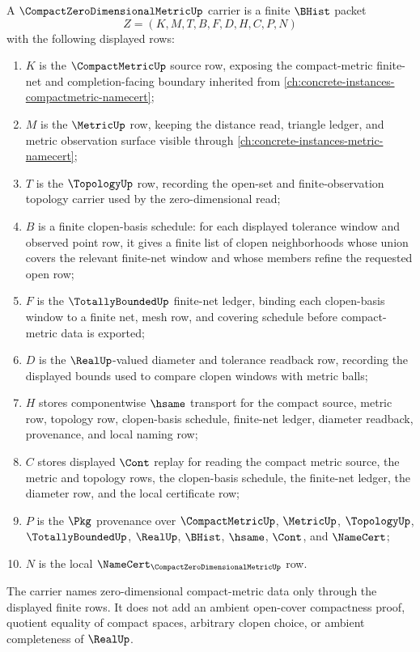 \begin{definition}
\label{def:compact-zero-dimensional-metric-carrier}
A $\CompactZeroDimensionalMetricUp$ carrier is a finite $\BHist$ packet
$$
Z=(K,M,T,B,F,D,H,C,P,N)
$$
with the following displayed rows:
\begin{enumerate}
\item $K$ is the $\CompactMetricUp$ source row, exposing the compact-metric finite-net and completion-facing boundary inherited from \autoref{ch:concrete-instances-compactmetric-namecert};
\item $M$ is the $\MetricUp$ row, keeping the distance read, triangle ledger, and metric observation surface visible through \autoref{ch:concrete-instances-metric-namecert};
\item $T$ is the $\TopologyUp$ row, recording the open-set and finite-observation topology carrier used by the zero-dimensional read;
\item $B$ is a finite clopen-basis schedule: for each displayed tolerance window and observed point row, it gives a finite list of clopen neighborhoods whose union covers the relevant finite-net window and whose members refine the requested open row;
\item $F$ is the $\TotallyBoundedUp$ finite-net ledger, binding each clopen-basis window to a finite net, mesh row, and covering schedule before compact-metric data is exported;
\item $D$ is the $\RealUp$-valued diameter and tolerance readback row, recording the displayed bounds used to compare clopen windows with metric balls;
\item $H$ stores componentwise $\hsame$ transport for the compact source, metric row, topology row, clopen-basis schedule, finite-net ledger, diameter readback, provenance, and local naming row;
\item $C$ stores displayed $\Cont$ replay for reading the compact metric source, the metric and topology rows, the clopen-basis schedule, the finite-net ledger, the diameter row, and the local certificate row;
\item $P$ is the $\Pkg$ provenance over $\CompactMetricUp$, $\MetricUp$, $\TopologyUp$, $\TotallyBoundedUp$, $\RealUp$, $\BHist$, $\hsame$, $\Cont$, and $\NameCert$;
\item $N$ is the local $\NameCert_{\CompactZeroDimensionalMetricUp}$ row.
\end{enumerate}
The carrier names zero-dimensional compact-metric data only through the displayed finite rows. It does not add an ambient open-cover compactness proof, quotient equality of compact spaces, arbitrary clopen choice, or ambient completeness of $\RealUp$.
\end{definition}

